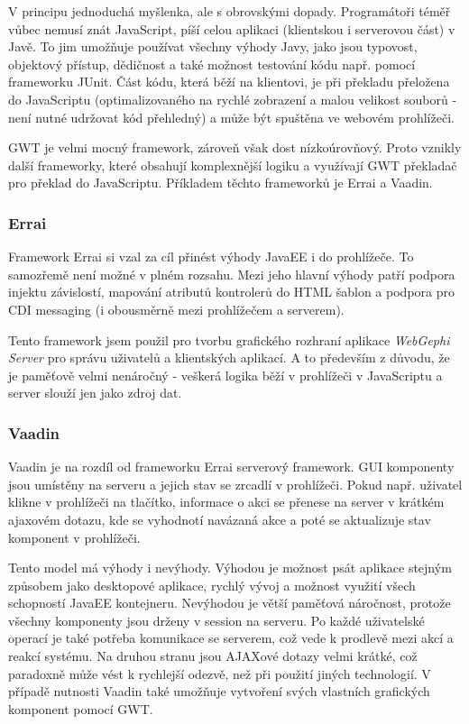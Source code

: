 \documentclass[thesis=M,czech]{FITthesis}[2014/05/6]
\begin{document}
V principu jednoduchá myšlenka, ale s obrovskými dopady. Programátoři téměř vůbec nemusí znát JavaScript, píší celou aplikaci 
(klientskou i serverovou část) v Javě. To jim umožňuje používat všechny výhody Javy, jako jsou typovost, objektový přístup, dědičnost a také 
možnost testování kódu např. pomocí frameworku JUnit. Část kódu, která běží na klientovi, je při překladu přeložena do JavaScriptu
(optimalizovaného na rychlé zobrazení a malou velikost souborů - není nutné udržovat kód přehledný) a může být spuštěna ve webovém prohlížeči.
 
GWT je velmi mocný framework, zároveň však dost nízkoúrovňový. Proto vznikly další frameworky, které obsahují komplexnější logiku a využívají GWT překladač pro 
překlad do JavaScriptu. Příkladem těchto frameworků je Errai a Vaadin.

\subsubsection{Errai}
Framework Errai\cite{errai} si vzal za cíl přinést výhody JavaEE i do prohlížeče. To samozřemě není možné v plném rozsahu. Mezi jeho hlavní výhody patří
podpora injektu závislostí, mapování atributů kontrolerů do HTML šablon a podpora pro CDI messaging (i obousměrně mezi prohlížečem a serverem).

Tento framework jsem použil pro tvorbu grafického rozhraní aplikace \textit{WebGephi Server} pro správu uživatelů a klientských aplikací.
A to především z důvodu, že je paměťově velmi nenáročný - veškerá logika běží v prohlížeči v JavaScriptu a server slouží jen jako zdroj dat.

\subsubsection{Vaadin}\label{sec:vaadin}
Vaadin\cite{vaadin} je na rozdíl od frameworku Errai serverový framework. GUI komponenty jsou umístěny na serveru a jejich stav se zrcadlí 
v prohlížeči. Pokud např. uživatel klikne v prohlížeči na tlačítko, informace o akci se přenese na server v krátkém ajaxovém dotazu, kde se vyhodnotí navázaná akce
a poté se aktualizuje stav komponent v prohlížeči.

Tento model má výhody i nevýhody. Výhodou je možnost psát aplikace stejným způsobem jako desktopové aplikace, rychlý vývoj a možnost využití všech schopností JavaEE kontejneru.
Nevýhodou je větší paměťová náročnost, protože všechny komponenty jsou drženy v session na serveru. Po každé uživatelské operací je také potřeba komunikace se serverem, což vede k prodlevě mezi akcí 
a reakcí systému. Na druhou stranu jsou AJAXové dotazy velmi krátké, což paradoxně může vést k rychlejší odezvě, než při použití jiných technologií. V případě nutnosti Vaadin také umožňuje
vytvoření svých vlastních grafických komponent pomocí GWT.
\end{document}

